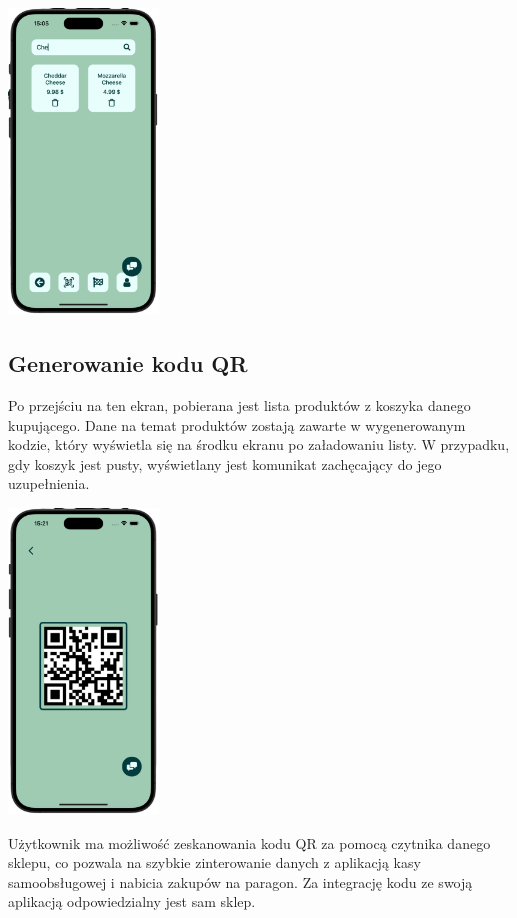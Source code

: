 \begin{center}
    \includegraphics[width=0.3\textwidth]{images/front/cart_filtered.png}
\end{center}


\subsection{Generowanie kodu QR}

Po przejściu na ten ekran, pobierana jest lista produktów z koszyka danego kupującego. Dane na temat produktów zostają zawarte w wygenerowanym kodzie, który wyświetla się na środku ekranu po załadowaniu listy. W przypadku, gdy koszyk jest pusty, wyświetlany jest komunikat zachęcający do jego uzupełnienia. 

\begin{center}
    \includegraphics[width=0.3\textwidth]{images/front/qr_page.png}
\end{center}

Użytkownik ma możliwość zeskanowania kodu QR za pomocą czytnika danego sklepu, co pozwala na szybkie zinterowanie danych z aplikacją kasy samoobsługowej i nabicia zakupów na paragon. Za integrację kodu ze swoją aplikacją odpowiedzialny jest sam sklep. 

